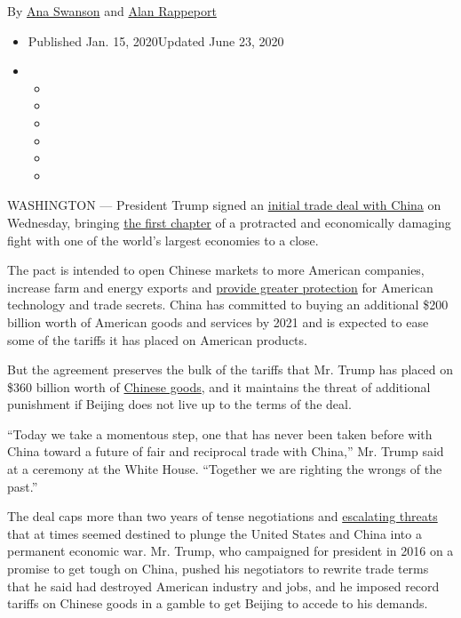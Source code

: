 By \href{https://www.nytimes3xbfgragh.onion/by/ana-swanson}{Ana Swanson}
and \href{https://www.nytimes3xbfgragh.onion/by/alan-rappeport}{Alan
Rappeport}

\begin{itemize}
\item
  Published Jan. 15, 2020Updated June 23, 2020
\item
  \begin{itemize}
  \item
  \item
  \item
  \item
  \item
  \item
  \end{itemize}
\end{itemize}

WASHINGTON --- President Trump signed an
\href{https://www.nytimes3xbfgragh.onion/2020/06/23/business/economy/trump-navarro-china-trade-deal.html}{initial
trade deal with China} on Wednesday, bringing
\href{https://www.nytimes3xbfgragh.onion/2020/01/15/upshot/china-us-trade-peace.html}{the
first chapter} of a protracted and economically damaging fight with one
of the world's largest economies to a close.

The pact is intended to open Chinese markets to more American companies,
increase farm and energy exports and
\href{https://www.nytimes3xbfgragh.onion/2020/01/14/business/economy/trump-china-trade-deal.html}{provide
greater protection} for American technology and trade secrets. China has
committed to buying an additional \$200 billion worth of American goods
and services by 2021 and is expected to ease some of the tariffs it has
placed on American products.

But the agreement preserves the bulk of the tariffs that Mr. Trump has
placed on \$360 billion worth of
\href{https://www.nytimes3xbfgragh.onion/2018/08/21/business/economy/trump-china-tariffs-consumers.html}{Chinese
goods}, and it maintains the threat of additional punishment if Beijing
does not live up to the terms of the deal.

``Today we take a momentous step, one that has never been taken before
with China toward a future of fair and reciprocal trade with China,''
Mr. Trump said at a ceremony at the White House. ``Together we are
righting the wrongs of the past.''

The deal caps more than two years of tense negotiations and
\href{https://www.nytimes3xbfgragh.onion/2019/08/23/business/china-tariffs-trump.html}{escalating
threats} that at times seemed destined to plunge the United States and
China into a permanent economic war. Mr. Trump, who campaigned for
president in 2016 on a promise to get tough on China, pushed his
negotiators to rewrite trade terms that he said had destroyed American
industry and jobs, and he imposed record tariffs on Chinese goods in a
gamble to get Beijing to accede to his demands.

